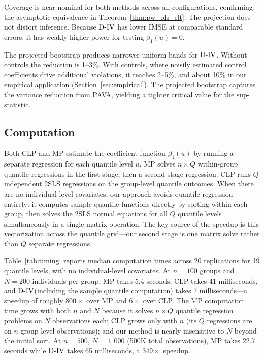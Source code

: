 \documentclass[12pt]{article}
\newcommand{\est}{\ensuremath{\textnormal{D-IV}}\xspace}
\newcommand{\CLP}{CLP\xspace}
\newcommand{\MP}{MP\xspace}
\begin{document}
Coverage is near-nominal for both methods across all configurations, confirming the asymptotic equivalence in Theorem~\ref{thm:pw_ols_clt}. The projection does not distort inference. Because \est has lower IMSE at comparable standard errors, it has weakly higher power for testing $\beta_1(u) = 0$.

The projected bootstrap produces narrower uniform bands for \est. Without controls the reduction is 1--3\%. With controls, where noisily estimated control coefficients drive additional violations, it reaches 2--5\%, and about 10\% in our empirical application (Section~\ref{sec:empirical}). The projected bootstrap captures the variance reduction from PAVA, yielding a tighter critical value for the sup-statistic.

\subsection{Computation}\label{sec:computation}

Both \CLP and \MP estimate the coefficient function $\beta_1(u)$ by running a separate regression for each quantile level $u$. \MP solves $n \times Q$ within-group quantile regressions in the first stage, then a second-stage regression. \CLP runs $Q$ independent 2SLS regressions on the group-level quantile outcomes. When there are no individual-level covariates, our approach avoids quantile regression entirely: it computes sample quantile functions directly by sorting within each group, then solves the 2SLS normal equations for all $Q$ quantile levels simultaneously in a single matrix operation. The key source of the speedup is this vectorization across the quantile grid---our second stage is one matrix solve rather than $Q$ separate regressions.

Table~\ref{tab:timing} reports median computation times across 20 replications for 19 quantile levels, with no individual-level covariates. At $n = 100$ groups and $N = 200$ individuals per group, \MP takes 5.4 seconds, \CLP takes 41 milliseconds, and \est (including the sample quantile computation) takes 7 milliseconds---a speedup of roughly $800\times$ over \MP and $6\times$ over \CLP. The \MP computation time grows with both $n$ and $N$ because it solves $n \times Q$ quantile regression problems on $N$ observations each; \CLP grows only with $n$ (its $Q$ regressions are on $n$ group-level observations); and our method is nearly insensitive to $N$ beyond the initial sort. At $n = 500$, $N = 1{,}000$ (500K total observations), \MP takes 22.7 seconds while \est takes 65 milliseconds, a $349\times$ speedup.
\end{document}
